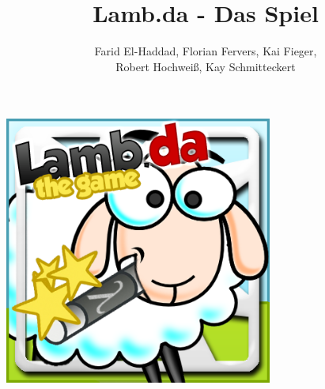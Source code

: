 \documentclass[parskip=full]{scrartcl}
\title{Lamb.da - Das Spiel}
\author{ 	
Farid El-Haddad,  Florian Fervers,  Kai Fieger,
\\
Robert Hochweiß, Kay Schmitteckert
}
\begin{document}
\maketitle
	\begin{center}
	\includegraphics[width=250pt]{../gui/icon.png}
	\end{center}
	
\newpage
\tableofcontents
\newpage

\newpage

\newpage

\newpage

\newpage

\newpage

\newpage

\newpage

\newpage

\newpage

\newpage

\newpage

\end{document}
